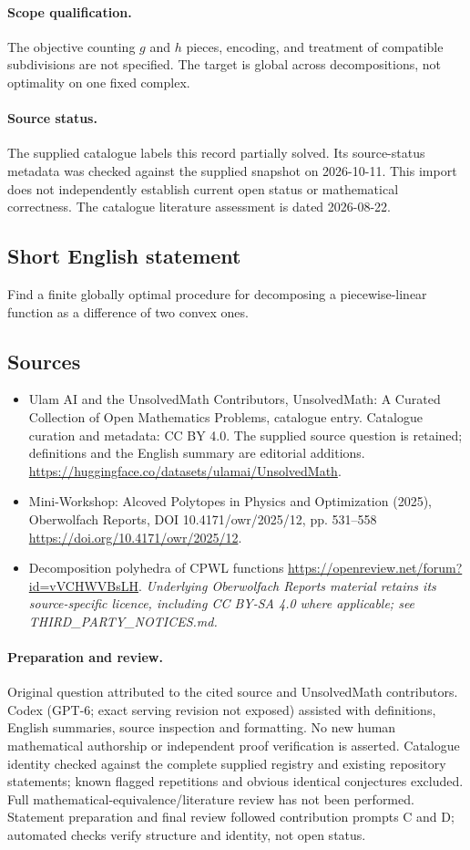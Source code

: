 \documentclass[11pt]{article}
\begin{document}
\paragraph{Scope qualification.}
The objective counting $g$ and $h$ pieces, encoding, and treatment of compatible subdivisions are not specified. The target is global across decompositions, not optimality on one fixed complex.
\paragraph{Source status.}
The supplied catalogue labels this record partially solved. Its source-status metadata was checked against the supplied snapshot on 2026-10-11. This import does not independently establish current open status or mathematical correctness. The catalogue literature assessment is dated 2026-08-22.
\subsection{Short English statement}
Find a finite globally optimal procedure for decomposing a piecewise-linear function as a difference of two convex ones.
\subsection{Sources}
\begin{itemize}
\item[S1] Ulam AI and the UnsolvedMath Contributors, UnsolvedMath: A Curated Collection of Open Mathematics Problems, catalogue entry. Catalogue curation and metadata: CC BY 4.0. The supplied source question is retained; definitions and the English summary are editorial additions.
\url{https://huggingface.co/datasets/ulamai/UnsolvedMath}.
\item[S2] Mini-Workshop: Alcoved Polytopes in Physics and Optimization (2025), Oberwolfach Reports, DOI 10.4171/owr/2025/12, pp. 531--558
\url{https://doi.org/10.4171/owr/2025/12}.
\item[S3] Decomposition polyhedra of CPWL functions
\url{https://openreview.net/forum?id=vVCHWVBsLH}.
\textit{Underlying Oberwolfach Reports material retains its source-specific licence, including CC BY-SA 4.0 where applicable; see THIRD\_PARTY\_NOTICES.md.}
\end{itemize}
\paragraph{Preparation and review.}
Original question attributed to the cited source and UnsolvedMath contributors. Codex (GPT-6; exact serving revision not exposed) assisted with definitions, English summaries, source inspection and formatting. No new human mathematical authorship or independent proof verification is asserted. Catalogue identity checked against the complete supplied registry and existing repository statements; known flagged repetitions and obvious identical conjectures excluded. Full mathematical-equivalence/literature review has not been performed. Statement preparation and final review followed contribution prompts C and D; automated checks verify structure and identity, not open status.
\label{end:statement}
\end{document}

